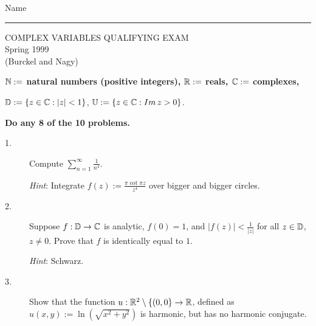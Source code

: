 \documentclass[bbb]{report}
\def\ds{\displaystyle}
\def\R{{\Bbb R}}
\def\D{{\Bbb D}}
\def\U{{\Bbb U}}
\def\C{{\Bbb C}}
\def\N{{\Bbb N}}
\begin{document}

\begin{Large}
\hfill Name \rule{2.15in}{.01in}
\par
\vspace{.25in}

\begin{center}
   COMPLEX VARIABLES QUALIFYING EXAM \\
   Spring 1999 \\
   (Burckel and Nagy) \\
\end{center}


\vspace{.1in}


\begin{center}
{\bf
$\N:=$ natural numbers (positive integers),
$\R:=$ reals,
$\C:=$ complexes,

$\D:=\{z\in\C:|z|<1\}$,
$\U:= \{z\in\C: Im\,z>0\}$.
}

\vspace{.2in}
{\bf Do any 8 of the 10 problems.}

\end{center}


\vspace{.2in}

\begin{description}

\item[1.]
Compute $\ds\sum^\infty_{n=1}\ds\frac{1}{n^4}$.

\item[\quad] {\it Hint}:
Integrate $f(z):=\ds\frac{\pi\cot\pi z}{z^4}$ over bigger and bigger
circles.


\vspace{.2in}
\item[2.]
Suppose $f:\D\to\C$ is analytic, $f(0)=1$, and
$|f(z)|<\ds\frac{1}{|z|}$ for all $z\in\D$, $z\not= 0$.
Prove that $f$ is identically equal to $1$.

\item[\quad]  {\it Hint}: Schwarz.


\vspace{.2in}
\item[3.]
Show that the function $u:\R^2\setminus\{(0,0\}\to\R$,
defined as $u(x,y):=\ln\left(\ds\sqrt{x^2+y^2}\right)$
is harmonic, but has no harmonic conjugate.


\end{description}
\end{Large}
\end{document}
